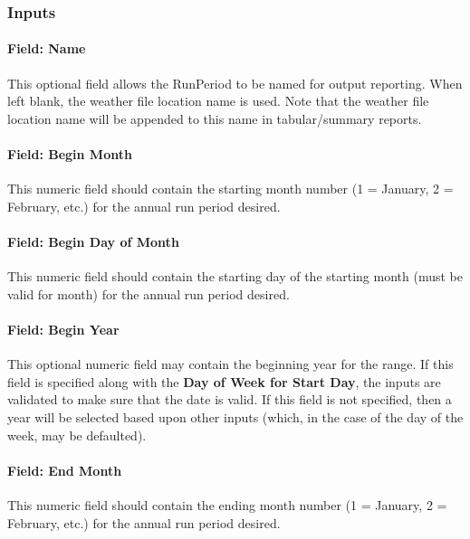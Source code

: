 \subsubsection{Inputs}\label{inputs-5-016}

\paragraph{Field: Name}\label{field-name-5-012}

This optional field allows the RunPeriod to be named for output reporting. When left blank, the weather file
location name is used. Note that the weather file location name will be appended to this name in
tabular/summary reports.

\paragraph{Field: Begin Month}\label{field-begin-month-2}

This numeric field should contain the starting month number (1 = January, 2 = February, etc.) for the annual
run period desired.

\paragraph{Field: Begin Day of Month}\label{field-begin-day-of-month-2}

This numeric field should contain the starting day of the starting month (must be valid for month) for the
annual run period desired.

\paragraph{Field: Begin Year}\label{field-begin-year}

This optional numeric field may contain the beginning year for the range. If this field is specified
along with the \textbf{Day of Week for Start Day}, the inputs are validated to make sure that the date is
valid. If this field is not specified, then a year will be selected based upon other inputs (which, in the
case of the day of the week, may be defaulted).

\paragraph{Field: End Month}\label{field-end-month-2}

This numeric field should contain the ending month number (1 = January, 2 = February, etc.) for the annual
run period desired.

